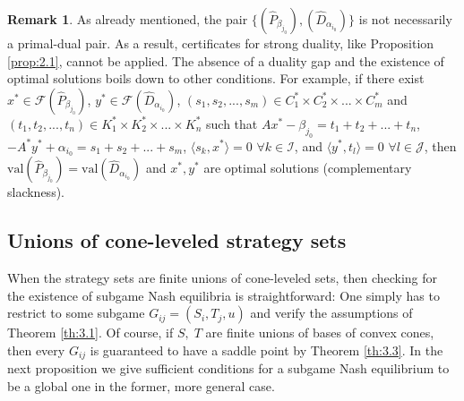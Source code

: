 \documentclass[11pt, twoside]{article}
\numberwithin{equation}{section}
\theoremstyle{definition}
\newtheorem{remark}{Remark}[section]
\begin{document}
\begin{remark} As already mentioned, the pair $\{(\widehat{P}_{\beta_{j_0}}),(\widehat{D}_{\alpha_{i_0}})\}$ is not necessarily a primal-dual pair. As a result, certificates for strong duality, like Proposition \ref{prop:2.1}, cannot be applied. The absence of a duality gap and the existence of optimal solutions boils down to other conditions. For example, if there exist $x^*\in\mathcal{F}(\widehat{P}_{\beta_{j_0}})$, $y^*\in\mathcal{F}(\widehat{D}_{\alpha_{i_0}})$, 
  $(s_1,s_2,...,s_m)\in C_1^*\times C_2^*\times...\times C_m^*$ and $(t_1,t_2,...,t_n)\in K_1^*\times K_2^*\times...\times K_n^*$ such that $Ax^*-\beta_{j_0}=t_1+t_2+...+t_n$, $-A^*y^*+\alpha_{i_0}=s_1+s_2+...+s_m$, $\langle s_k,x^*\rangle=0$ $\forall k\in\mathcal{I}$, and $\langle y^*,t_l\rangle=0$ $\forall l\in\mathcal{J}$, then $\text{val}(\widehat{P}_{\beta_{j_0}})=\text{val}(\widehat{D}_{\alpha_{i_0}})$ and $x^*,y^*$ are optimal solutions (complementary slackness).
  \end{remark}
  
\vspace{-0.1cm}\subsection{Unions of cone-leveled strategy sets}\label{sec:6.2}\vspace{-0.2cm}

When the strategy sets are finite unions of cone-leveled sets, then checking for the existence of subgame Nash equilibria is straightforward: One simply has to restrict to some subgame $G_{ij}=(S_i,T_j,u)$ and verify the assumptions of Theorem \ref{th:3.1}. Of course, if $S,\;T$ are finite unions of bases of convex cones, then every $G_{ij}$ is guaranteed to have a saddle point by Theorem \ref{th:3.3}. In the next proposition we give sufficient conditions for a subgame Nash equilibrium to be a global one in the former, more general case.\par
\end{document}
